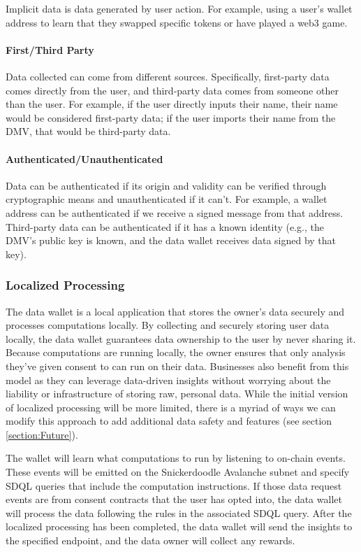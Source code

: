 Implicit data is data generated by user action. For example, using a user's wallet address to learn that they swapped specific tokens or have played a web3 game. 


\paragraph{First/Third Party}
Data collected can come from different sources. Specifically, first-party data comes directly from the user, and third-party data comes from 
someone other than the user. For example, if the user directly inputs their name, their name would be considered first-party data; if the 
user imports their name from the DMV, that would be third-party data.


\paragraph{Authenticated/Unauthenticated}
Data can be authenticated if its origin and validity can be verified through cryptographic means and unauthenticated if it can't. For example, 
a wallet address can be authenticated if we receive a signed message from that address. Third-party data can be authenticated if it has a known 
identity (e.g., the DMV's public key is known, and the data wallet receives data signed by that key). 

\subsubsection{Localized Processing} %

The data wallet is a local application that stores the owner's data securely and processes computations locally. By collecting and 
securely storing user data locally, the data wallet guarantees data ownership to the user by never sharing it. Because computations 
are running locally, the owner ensures that only analysis they've given consent to can run on their data. Businesses also benefit 
from this model as they can leverage data-driven insights without worrying about the liability or infrastructure of storing raw, 
personal data. While the initial version of localized processing will be more limited, there is a myriad of ways we can modify this 
approach to add additional data safety and features (see section \ref{section:Future}). 

The wallet will learn what computations to run by listening to on-chain events. These events will be emitted on the Snickerdoodle Avalanche 
subnet and specify SDQL queries that include the computation instructions. If those data request events are from consent contracts that the 
user has opted into, the data wallet will process the data following the rules in the associated SDQL query. After the localized processing 
has been completed, the data wallet will send the insights to the specified endpoint, and the data owner will collect any rewards.


